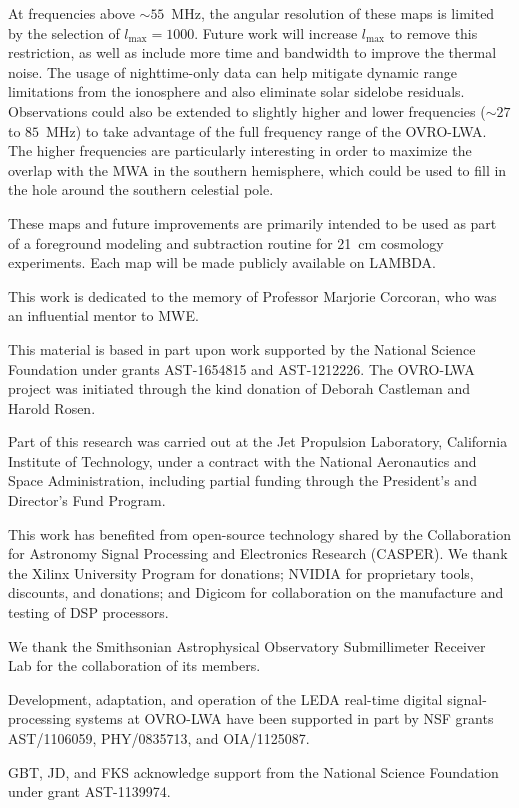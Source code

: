 \begin{bibunit}
At frequencies above $\sim55$~MHz, the angular resolution of these maps is limited by the selection
of $l_\text{max}=1000$. Future work will increase $l_\text{max}$ to remove this restriction, as well
as include more time and bandwidth to improve the thermal noise. The usage of nighttime-only data
can help mitigate dynamic range limitations from the ionosphere and also eliminate solar sidelobe
residuals. Observations could also be extended to slightly higher and lower frequencies ($\sim27$ to
$85$~MHz) to take advantage of the full frequency range of the OVRO-LWA. The higher frequencies are
particularly interesting in order to maximize the overlap with the MWA in the southern hemisphere,
which could be used to fill in the hole around the southern celestial pole.

These maps and future improvements are primarily intended to be used as part of a foreground
modeling and subtraction routine for 21~cm cosmology experiments. Each map will be made publicly
available on LAMBDA.

\acknowledgments
This work is dedicated to the memory of Professor Marjorie Corcoran, who was an influential mentor
to MWE.

This material is based in part upon work supported by the National Science Foundation under grants
AST-1654815 and AST-1212226. The OVRO-LWA project was initiated through the kind donation of Deborah
Castleman and Harold Rosen.

Part of this research was carried out at the Jet Propulsion Laboratory, California Institute of
Technology, under a contract with the National Aeronautics and Space Administration, including
partial funding through the President's and Director's Fund Program.

This work has benefited from open-source technology shared by the Collaboration for Astronomy Signal
Processing and Electronics Research (CASPER).  We thank the Xilinx University Program for donations;
NVIDIA for proprietary tools, discounts, and donations; and Digicom for collaboration on the
manufacture and testing of DSP processors.

We thank the Smithsonian Astrophysical Observatory Submillimeter Receiver Lab for the collaboration
of its members.

Development, adaptation, and operation of the LEDA real-time digital signal-processing systems at
OVRO-LWA have been supported in part by NSF grants AST/1106059, PHY/0835713, and OIA/1125087.

GBT, JD, and FKS acknowledge support from the National Science Foundation under grant AST-1139974.

\putbib[thesis]
\end{bibunit}

